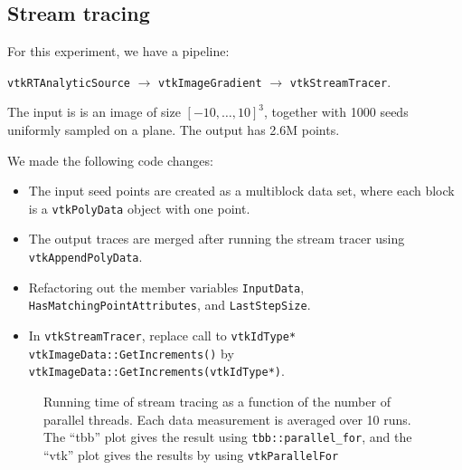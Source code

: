 \documentclass{article}
\begin{document}

\subsection{Stream tracing}
For this experiment, we have a pipeline:

{\tt vtkRTAnalyticSource}  $\rightarrow$ {\tt vtkImageGradient}
 $\rightarrow$ {\tt vtkStreamTracer}.

The input is is an image of size $[-10,\ldots,10]^3$, together with
1000 seeds uniformly sampled on a plane. The output has 2.6M points.

We made the following code changes:
\begin{itemize}
\item The input seed points are created as a multiblock data set,
  where each block is a {\tt vtkPolyData} object with one point.
\item The output traces are merged after running the stream tracer using
{\tt vtkAppendPolyData}.
\item Refactoring out the member variables {\tt InputData}, {\tt
  HasMatchingPointAttributes}, and {\tt LastStepSize}.
\item In {\tt vtkStreamTracer}, replace call to {\tt vtkIdType*
  vtkImageData::GetIncrements()} by {\tt
  vtkImageData::GetIncrements(vtkIdType*)}.
\end{itemize}

\begin{figure}[H]
\caption{Running time of stream tracing as a function of the number of parallel
  threads. Each data measurement is averaged over 10 runs. The
  ``tbb'' plot gives the result using {\tt tbb::parallel\_for}, and the ``vtk''
  plot gives the results by using {\tt vtkParallelFor} }
\label{fig:streamtrace}
\end{figure}
\end{document}

